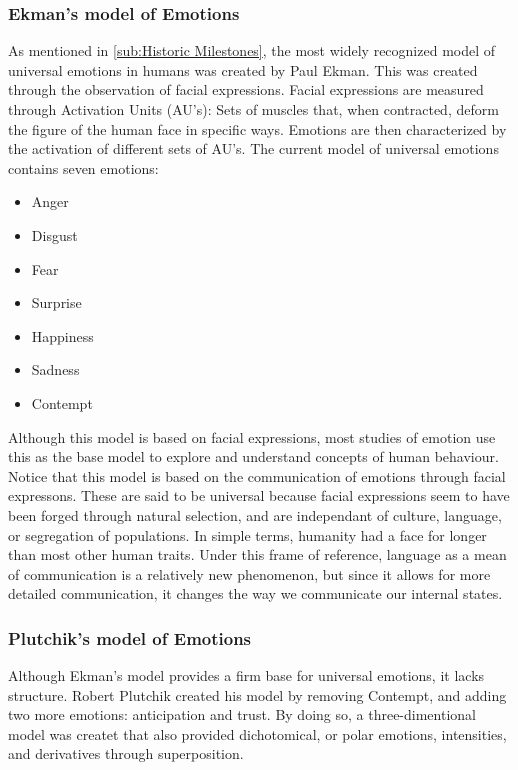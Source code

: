\subsubsection{Ekman's model of Emotions}\label{subs:Ekman's model of Emotions}
As mentioned in \ref{sub:Historic Milestones}, the most widely recognized model of universal emotions in humans was created by Paul Ekman\cite{ekman1992basic}. This was created through the observation of facial expressions. Facial expressions are measured through Activation Units (AU's): Sets of muscles that, when contracted, deform the figure of the human face in specific ways. Emotions are then characterized by the activation of different sets of AU's. The current model of universal emotions contains seven emotions:

\begin{itemize}
  \item Anger
  \item Disgust
  \item Fear
  \item Surprise
  \item Happiness
  \item Sadness
  \item Contempt
\end{itemize}

Although this model is based on facial expressions, most studies of emotion use this as the base model to explore and understand concepts of human behaviour. Notice that this model is based on the communication of emotions through facial expressons. These are said to be universal because facial expressions seem to have been forged through natural selection, and are independant of culture, language, or segregation of populations. In simple terms, humanity had a face for longer than most other human traits. Under this frame of reference, language as a mean of communication is a relatively new phenomenon, but since it allows for more detailed communication, it changes the way we communicate our internal states.

\subsubsection{Plutchik's model of Emotions}\label{subs:Plutchik's model of Emotions}
Although Ekman's model provides a firm base for universal emotions, it lacks structure. Robert Plutchik created his model by removing Contempt, and adding two more emotions: anticipation and trust. By doing so, a three-dimentional model was createt that also provided dichotomical, or polar emotions, intensities, and derivatives through superposition.

